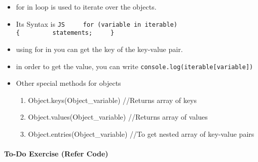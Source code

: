 \documentclass[
  paper=a4,
  ,captions=tableheading
]{scrartcl}
\providecommand{\tightlist}{%
  \setlength{\itemsep}{0pt}\setlength{\parskip}{0pt}}
\begin{document}
\begin{itemize}
\tightlist
\item
  for in loop is used to iterate over the objects.
\item
  Its Syntax is
  \texttt{JS\ \ \ \ \ for\ (variable\ in\ iterable)\{\ \ \ \ \ \ \ \ \ statements;\ \ \ \ \ \}}
\item
  using for in you can get the key of the key-value pair.
\item
  in order to get the value, you can write
  \texttt{console.log(iterable{[}variable{]})}
\item
  Other special methods for objects

  \begin{enumerate}
  \def\labelenumi{\arabic{enumi}.}
  \tightlist
  \item
    Object.keys(Object\_variable) //Returns array of keys
  \item
    Object.values(Object\_variable) //Returns array of values
  \item
    Object.entries(Object\_variable) //To get nested array of key-value
    pairs
  \end{enumerate}
\end{itemize}

\hypertarget{to-do-exercise-refer-code}{%
\paragraph{To-Do Exercise (Refer
Code)}\label{to-do-exercise-refer-code}}
\end{document}
